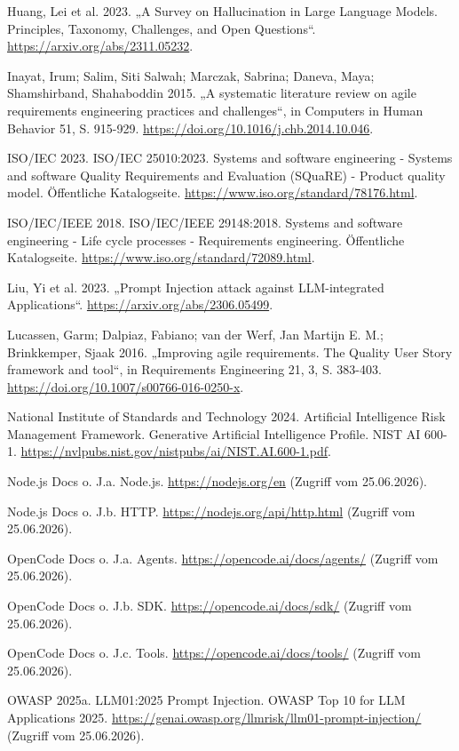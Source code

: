 \documentclass[12pt,a4paper,oneside]{scrreprt}
\begin{document}
Huang, Lei et al. 2023. „A Survey on Hallucination in Large Language Models. Principles, Taxonomy, Challenges, and Open Questions“. \url{https://arxiv.org/abs/2311.05232}.

Inayat, Irum; Salim, Siti Salwah; Marczak, Sabrina; Daneva, Maya; Shamshirband, Shahaboddin 2015. „A systematic literature review on agile requirements engineering practices and challenges“, in Computers in Human Behavior 51, S. 915-929. \url{https://doi.org/10.1016/j.chb.2014.10.046}.

ISO/IEC 2023. ISO/IEC 25010:2023. Systems and software engineering - Systems and software Quality Requirements and Evaluation (SQuaRE) - Product quality model. Öffentliche Katalogseite. \url{https://www.iso.org/standard/78176.html}.

ISO/IEC/IEEE 2018. ISO/IEC/IEEE 29148:2018. Systems and software engineering - Life cycle processes - Requirements engineering. Öffentliche Katalogseite. \url{https://www.iso.org/standard/72089.html}.

Liu, Yi et al. 2023. „Prompt Injection attack against LLM-integrated Applications“. \url{https://arxiv.org/abs/2306.05499}.

Lucassen, Garm; Dalpiaz, Fabiano; van der Werf, Jan Martijn E. M.; Brinkkemper, Sjaak 2016. „Improving agile requirements. The Quality User Story framework and tool“, in Requirements Engineering 21, 3, S. 383-403. \url{https://doi.org/10.1007/s00766-016-0250-x}.

National Institute of Standards and Technology 2024. Artificial Intelligence Risk Management Framework. Generative Artificial Intelligence Profile. NIST AI 600-1. \url{https://nvlpubs.nist.gov/nistpubs/ai/NIST.AI.600-1.pdf}.

Node.js Docs o. J.a. Node.js. \url{https://nodejs.org/en} (Zugriff vom 25.06.2026).

Node.js Docs o. J.b. HTTP. \url{https://nodejs.org/api/http.html} (Zugriff vom 25.06.2026).

OpenCode Docs o. J.a. Agents. \url{https://opencode.ai/docs/agents/} (Zugriff vom 25.06.2026).

OpenCode Docs o. J.b. SDK. \url{https://opencode.ai/docs/sdk/} (Zugriff vom 25.06.2026).

OpenCode Docs o. J.c. Tools. \url{https://opencode.ai/docs/tools/} (Zugriff vom 25.06.2026).

OWASP 2025a. LLM01:2025 Prompt Injection. OWASP Top 10 for LLM Applications 2025. \url{https://genai.owasp.org/llmrisk/llm01-prompt-injection/} (Zugriff vom 25.06.2026).
\end{document}
